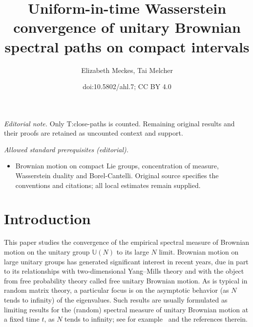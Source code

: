 \documentclass[11pt]{article}
\title{Uniform-in-time Wasserstein convergence of unitary Brownian spectral paths on compact intervals}
\author{Elizabeth Meckes, Tai Melcher}
\date{doi:10.5802/ahl.7; CC BY 4.0}
\theoremstyle{definition}
\numberwithin{equation}{section}
\numberwithin{figure}{section}
\numberwithin{table}{section}
\newcommand{\Unitary}[1]{\mathbb{U}\left(#1\right)}
\begin{document}
\maketitle
\noindent\textit{Editorial note.} Only T:close-paths is counted. Remaining original results and their proofs are retained as uncounted context and support.\par\medskip
\noindent\textit{Allowed standard prerequisites (editorial).}\begin{itemize}
\item Brownian motion on compact Lie groups, concentration of measure, Wasserstein duality and Borel-Cantelli. Original source specifies the conventions and citations; all local estimates remain supplied.
\end{itemize}\medskip
\section{Introduction}

This paper studies the convergence of the empirical spectral measure of Brownian motion on the unitary group $\Unitary{N}$ to its large $N$ limit. Brownian motion on large unitary groups has generated significant interest in recent years, due in part to its relationships with two-dimensional Yang--Mills theory and with the object from free probability theory called free unitary Brownian motion. As is typical in random matrix theory, a particular focus is on the asymptotic behavior (as $N$ tends to infinity) of the eigenvalues. Such results are usually formulated as limiting results for the (random) spectral measure of unitary Brownian motion at a fixed time $t$, as $N$ tends to infinity; see for example~\cite{Rains1997, Xu1997,Biane1997,Biane1997-2, Levy2008,LevyMaida2010,DHK2013, Kemp2015,CDK2016} and the references therein.
\end{document}
